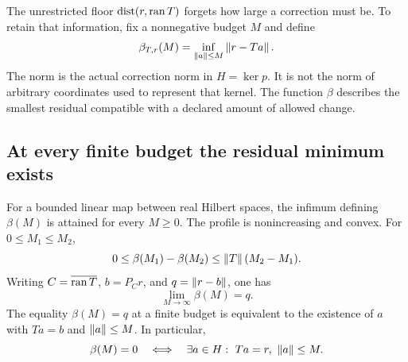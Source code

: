 \label{sec:budget-frontier}
The unrestricted floor $\operatorname{dist}(r,\operatorname{ran} T)$ forgets how large a correction must be. To retain that information, fix a nonnegative budget $M$ and define
\[
 \beta_{T,r}(M)=\inf_{\left\lVert a\right\rVert\le M}\left\lVert r-Ta\right\rVert.
\]
The norm is the actual correction norm in $H=\ker p$. It is not the norm of arbitrary coordinates used to represent that kernel. The function $\beta$ describes the smallest residual compatible with a declared amount of allowed change.

\subsection{At every finite budget the residual minimum exists}
\begin{theorem}\label{WR03}
For a bounded linear map between real Hilbert spaces, the infimum defining $\beta(M)$ is attained for every $M\ge0$. The profile is nonincreasing and convex. For $0\le M_1\le M_2$,
\[
 0\le\beta(M_1)-\beta(M_2)\le\left\lVert T\right\rVert(M_2-M_1).
\]
Writing $C=\overline{\operatorname{ran} T}$, $b=P_Cr$, and $q=\left\lVert r-b\right\rVert$, one has
\[
 \lim_{M\to\infty}\beta(M)=q.
\]
The equality $\beta(M)=q$ at a finite budget is equivalent to the existence of $a$ with $Ta=b$ and $\left\lVert a\right\rVert\le M$. In particular,
\[
 \beta(M)=0\quad\Longleftrightarrow\quad
 \exists a\in H:\ Ta=r,\ \left\lVert a\right\rVert\le M.
\]
\end{theorem}
